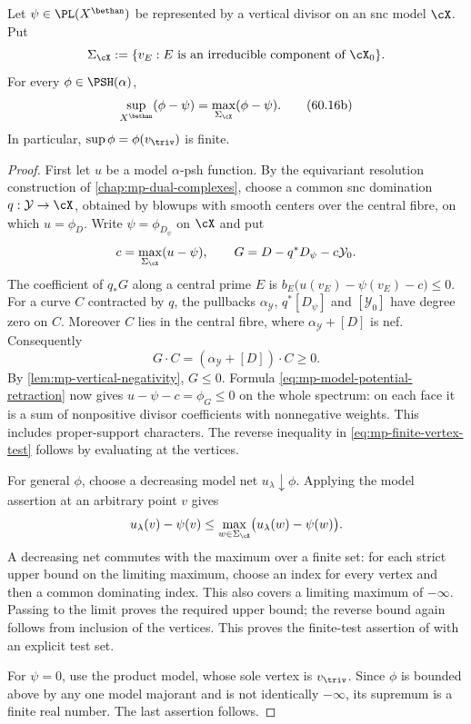\begin{samepage}
\begin{proposition}\label{prop:mp-finite-vertex-test}
Let $\psi\in\PL(X^{\bethan})$ be represented by a vertical divisor on an snc model $\cX$. Put
\[
 \Sigma_{\cX}:=\{v_E:E\text{ is an irreducible component of }\cX_0\}.
\]
For every $\phi\in\PSH(\alpha)$,
\[
 \sup_{X^{\bethan}}(\phi-\psi)
       =\max_{\Sigma_{\cX}}(\phi-\psi).
\tag{60.16b}\label{eq:mp-finite-vertex-test}
\]
In particular, $\sup\phi=\phi(v_{\triv})$ is finite.
\end{proposition}
\end{samepage}

\begin{proof}
First let $u$ be a model $\alpha$-psh function. By the equivariant resolution construction of \cref{chap:mp-dual-complexes}, choose a common snc domination $q:\mathcal Y\to\cX$, obtained by blowups with smooth centers over the central fibre, on which $u=\phi_D$. Write $\psi=\phi_{D_\psi}$ on $\cX$ and put
\[
 c=\max_{\Sigma_{\cX}}(u-\psi),\qquad
 G=D-q^*D_\psi-c\mathcal Y_0.
\]
The coefficient of $q_*G$ along a central prime $E$ is
$b_E\bigl(u(v_E)-\psi(v_E)-c\bigr)\leq0$.
For a curve $C$ contracted by $q$, the pullbacks $\alpha_{\mathcal Y}$, $q^*[D_\psi]$ and $[\mathcal Y_0]$ have degree zero on $C$. Moreover $C$ lies in the central fibre, where $\alpha_{\mathcal Y}+[D]$ is nef. Consequently
\[
 G\cdot C=(\alpha_{\mathcal Y}+[D])\cdot C\geq0.
\]
By \cref{lem:mp-vertical-negativity}, $G\leq0$. Formula \eqref{eq:mp-model-potential-retraction} now gives $u-\psi-c=\phi_G\leq0$ on the whole spectrum: on each face it is a sum of nonpositive divisor coefficients with nonnegative weights. This includes proper-support characters. The reverse inequality in \eqref{eq:mp-finite-vertex-test} follows by evaluating at the vertices.

For general $\phi$, choose a decreasing model net $u_\lambda\downarrow\phi$. Applying the model assertion at an arbitrary point $v$ gives
\[
 u_\lambda(v)-\psi(v)
      \leq\max_{w\in\Sigma_{\cX}}
                     \bigl(u_\lambda(w)-\psi(w)\bigr).
\]
A decreasing net commutes with the maximum over a finite set: for each strict upper bound on the limiting maximum, choose an index for every vertex and then a common dominating index. This also covers a limiting maximum of $-\infty$. Passing to the limit proves the required upper bound; the reverse bound again follows from inclusion of the vertices. This proves the finite-test assertion of \cite[Proposition~4.3.6, p.~41]{MPTropicalV2} with an explicit test set.

For $\psi=0$, use the product model, whose sole vertex is $v_{\triv}$. Since $\phi$ is bounded above by any one model majorant and is not identically $-\infty$, its supremum is a finite real number. The last assertion follows.
\end{proof}

